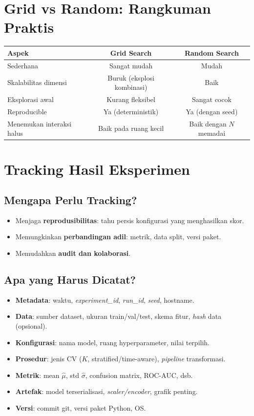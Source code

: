 \documentclass[11pt,a4paper]{article}
\begin{document}
\section{Grid vs Random: Rangkuman Praktis}
\begin{center}
\begin{tabular}{@{}lcc@{}}
\toprule
Aspek & Grid Search & Random Search \\
\midrule
Sederhana & Sangat mudah & Mudah \\
Skalabilitas dimensi & Buruk (eksplosi kombinasi) & Baik \\
Eksplorasi awal & Kurang fleksibel & Sangat cocok \\
Reproducible & Ya (deterministik) & Ya (dengan seed) \\
Menemukan interaksi halus & Baik pada ruang kecil & Baik dengan $N$ memadai \\
\bottomrule
\end{tabular}
\end{center}

\section{Tracking Hasil Eksperimen}
\subsection{Mengapa Perlu Tracking?}
\begin{itemize}[leftmargin=1.2em]
  \item Menjaga \textbf{reprodusibilitas}: tahu persis konfigurasi yang menghasilkan skor.
  \item Memungkinkan \textbf{perbandingan adil}: metrik, data split, versi paket.
  \item Memudahkan \textbf{audit dan kolaborasi}.
\end{itemize}

\subsection{Apa yang Harus Dicatat?}
\begin{itemize}[leftmargin=1.2em]
  \item \textbf{Metadata}: waktu, \emph{experiment\_id}, \emph{run\_id}, \emph{seed}, hostname.
  \item \textbf{Data}: sumber dataset, ukuran train/val/test, skema fitur, \emph{hash} data (opsional).
  \item \textbf{Konfigurasi}: nama model, ruang hyperparameter, nilai terpilih.
  \item \textbf{Prosedur}: jenis CV ($K$, stratified/time-aware), \emph{pipeline} transformasi.
  \item \textbf{Metrik}: mean $\hat{\mu}$, std $\hat{\sigma}$, confusion matrix, ROC-AUC, dsb.
  \item \textbf{Artefak}: model terserialisasi, \emph{scaler/encoder}, grafik penting.
  \item \textbf{Versi}: commit git, versi paket Python, OS.
\end{itemize}
\end{document}
